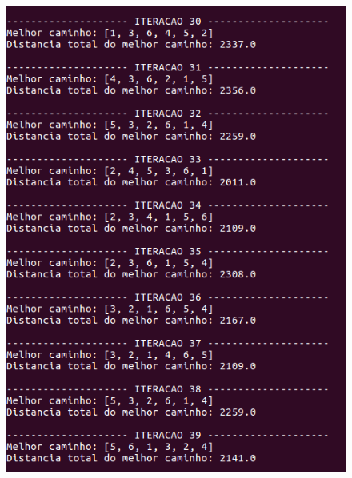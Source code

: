 \documentclass[hidelinks,12pt]{article}
\begin{document}
		\begin{figure}[!h]
			\centering
			\includegraphics[scale=0.6]{Figures/m6-1-4.png}
		\end{figure}

		\newpage
\end{document}
